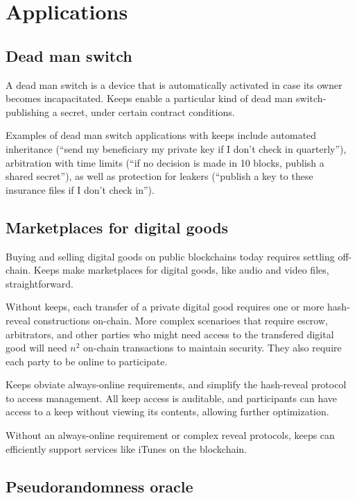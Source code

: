 \documentclass[11pt]{article}
\begin{document}
\section{Applications} \label{applications}

\subsection{Dead man switch}

A dead man switch is a device that is automatically activated in case
its owner becomes incapacitated. Keeps enable a particular kind of
dead man switch- publishing a secret, under certain contract
conditions.

Examples of dead man switch applications with keeps include automated
inheritance (``send my beneficiary my private key if I don't check in
quarterly''), arbitration with time limits (``if no decision is made in
10 blocks, publish a shared secret''), as well as protection for
leakers (``publish a key to these insurance files if I don't check
in'').

\subsection{Marketplaces for digital goods}

Buying and selling digital goods on public blockchains today requires
settling off-chain. Keeps make marketplaces for digital goods, like
audio and video files, straightforward.

Without keeps, each transfer of a private digital good requires one or
more hash-reveal constructions on-chain. More complex scenarioes
that require escrow, arbitrators, and other parties who might need
access to the transfered digital good will need ${n^2}$ on-chain
transactions to maintain security. They also require each party to be
online to participate.

Keeps obviate always-online requirements, and simplify the hash-reveal
protocol to access management. All keep access is auditable, and
participants can have access to a keep without viewing its contents,
allowing further optimization.

Without an always-online requirement or complex reveal protocols,
keeps can efficiently support services like iTunes on the blockchain.

\subsection{Pseudorandomness oracle}
\end{document}
